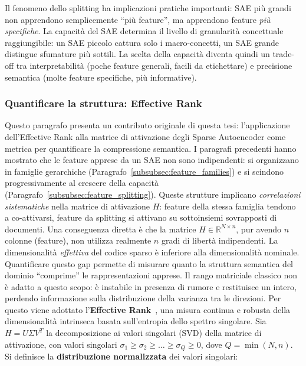 Il fenomeno dello splitting ha implicazioni pratiche importanti: SAE più grandi non apprendono semplicemente ``più feature'', ma apprendono feature \textit{più specifiche}. La capacità del SAE determina il livello di granularità concettuale raggiungibile: un SAE piccolo cattura solo i macro-concetti, un SAE grande distingue sfumature più sottili. La scelta della capacità diventa quindi un trade-off tra interpretabilità (poche feature generali, facili da etichettare) e precisione semantica (molte feature specifiche, più informative).



\subsubsection{Quantificare la struttura: Effective Rank}
\label{subsubsec:effective_rank}
Questo paragrafo presenta un contributo originale di questa tesi: l'applicazione dell'Effective Rank alla matrice di attivazione degli Sparse Autoencoder come metrica per quantificare la compressione semantica.
I paragrafi precedenti hanno mostrato che le feature apprese da un SAE non sono indipendenti: si organizzano in famiglie gerarchiche (Paragrafo~\ref{subsubsec:feature_families}) e si scindono progressivamente al crescere della capacità (Paragrafo~\ref{subsubsec:feature_splitting}). Queste strutture implicano \textit{correlazioni sistematiche} nella matrice di attivazione $H$: feature della stessa famiglia tendono a co-attivarsi, feature da splitting si attivano su sottoinsiemi sovrapposti di documenti.
Una conseguenza diretta è che la matrice $H \in \mathbb{R}^{N \times n}$, pur avendo $n$ colonne (feature), non utilizza realmente $n$ gradi di libertà indipendenti. La dimensionalità \textit{effettiva} del codice sparso è inferiore alla dimensionalità nominale. Quantificare questo gap permette di misurare quanto la struttura semantica del dominio ``comprime'' le rappresentazioni apprese.
Il rango matriciale classico non è adatto a questo scopo: è instabile in presenza di rumore e restituisce un intero, perdendo informazione sulla distribuzione della varianza tra le direzioni. Per questo viene adottato l'\textbf{Effective Rank}~\parencite{roy2007effective}, una misura continua e robusta della dimensionalità intrinseca basata sull'entropia dello spettro singolare.
Sia $H = U \Sigma V^T$ la decomposizione ai valori singolari (SVD) della matrice di attivazione, con valori singolari $\sigma_1 \geq \sigma_2 \geq \dots \geq \sigma_Q \geq 0$, dove $Q = \min(N, n)$. Si definisce la \textbf{distribuzione normalizzata} dei valori singolari:
